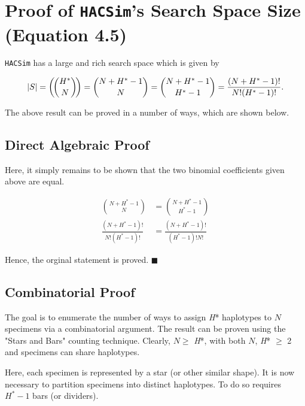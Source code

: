 \chapter{Proof of {\tt HACSim}'s Search Space Size (Equation 4.5)}

{\tt HACSim} has a large and rich search space which is given by

\begin{equation}
|S| = \multichoose{H^*}{N} = {{N + H^* - 1}\choose{N}} = {{N + H^* - 1}\choose{H^* - 1}} = \frac{(N + H^* - 1)!}{N!(H^* - 1)!}.
\end{equation}

\noindent The above result can be proved in a number of ways, which are shown below.

\section{Direct Algebraic Proof}

Here, it simply remains to be shown that the two binomial coefficients given above are equal. 

\vspace{5mm}

\begin{align*}
\binom{N + H^* - 1}{N} &= \binom{N + H^* - 1}{H^* - 1} \\
\frac{(N + H^* - 1)!}{N!(H^* - 1)!} &= \frac{(N + H^* - 1)!}{(H^* - 1)!N!}  
\end{align*} 

Hence, the orginal statement is proved. $\blacksquare$ 



\section{Combinatorial Proof}

The goal is to enumerate the number of ways to assign \textit{H}* haplotypes to $N$ specimens via a combinatorial argument. The result can be proven using the "Stars and Bars" counting technique. Clearly, $N \geq$ \textit{H}*, with both $N$, \textit{H}* $\geq$ 2 and specimens can share haplotypes.

\vspace{5mm} 

Here, each specimen is represented by a star (or other similar shape). It is now necessary to partition specimens into distinct haplotypes. To do so requires $H^* - 1$ bars (or dividers). 

